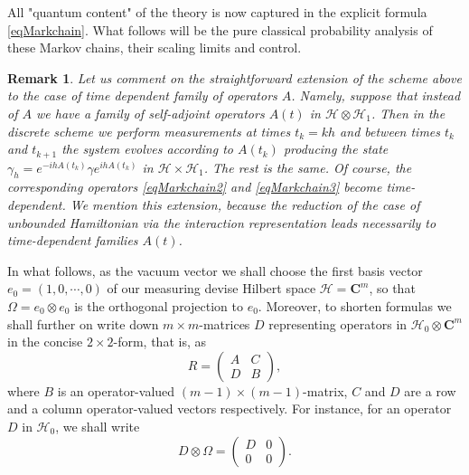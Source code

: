 \documentclass[10pt,a4paper]{amsart}
\def\HC{\mathcal{H}}
\def\C{\mathbf{C}}
\def\ga{\gamma}
\newtheorem{remark}{Remark}
\newcommand{\Om}{\Omega}
\begin{document}
All "quantum content" of the theory is now captured in the explicit formula \eqref{eqMarkchain}.
What follows will be
the pure classical probability analysis of these Markov chains, their scaling limits and control.

\begin{remark}
\label{redtimedepder}
Let us comment on the straightforward extension of the scheme above to the case of time dependent family
of operators $A$. Namely, suppose that instead of $A$ we have a family of self-adjoint
operators $A(t)$ in $\HC\otimes \HC_1$. Then in the discrete scheme we perform measurements at times
 $t_k=kh$ and between times $t_k$ and $t_{k+1}$ the system evolves according to $A(t_k)$ producing the state
$\ga_h=e^{-ihA(t_k)}\ga e^{ihA(t_k)}$ in $\HC\times \HC_1$. The rest is the same.
Of course, the corresponding  operators \eqref{eqMarkchain2} and \eqref{eqMarkchain3}
become time-dependent. We mention this extension, because the reduction
of the case of unbounded Hamiltonian via the interaction representation leads
necessarily to time-dependent families $A(t)$.
\end{remark}

In what follows, as the vacuum vector we shall choose the first basis vector $e_0=(1,0,\cdots , 0)$
 of our measuring devise Hilbert space $\HC=\C^m$, so that $\Om =e_0\otimes e_0$
 is the orthogonal projection to $e_0$.
Moreover, to shorten formulas we shall further on write down $m\times m$-matrices
 $D$ representing operators in $\HC_0\otimes \C^m$
 in the concise $2\times 2$-form, that is, as
 \[
R= \begin{pmatrix}
A & C   \\
D & B
\end{pmatrix},
\]
where $B$ is an operator-valued  $(m-1)\times (m-1)$-matrix, $C$ and $D$ are a row
and a column operator-valued vectors respectively.
 For instance, for an operator $D$ in $\HC_0$, we shall write
 \[
D\otimes \Omega
=\begin{pmatrix}
D & 0   \\
0 & 0
\end{pmatrix}.
\]
\end{document}
